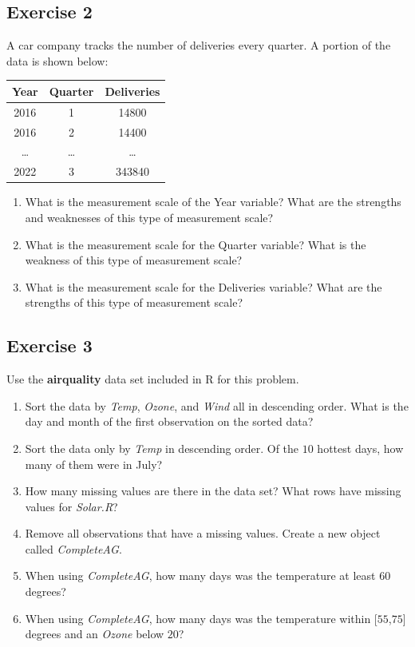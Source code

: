 \documentclass[
  letterpaper,
  DIV=11,
  numbers=noendperiod]{scrreprt}
\providecommand{\tightlist}{%
  \setlength{\itemsep}{0pt}\setlength{\parskip}{0pt}}\usepackage{longtable,booktabs,array}
\begin{document}
\hypertarget{exercise-2}{%
\subsection*{Exercise 2}\label{exercise-2}}

A car company tracks the number of deliveries every quarter. A portion
of the data is shown below:

\begin{longtable}[]{@{}ccc@{}}
\toprule()
Year & Quarter & Deliveries \\
\midrule()
\endhead
2016 & 1 & 14800 \\
2016 & 2 & 14400 \\
\ldots{} & \ldots{} & \ldots{} \\
2022 & 3 & 343840 \\
\bottomrule()
\end{longtable}

\begin{enumerate}
\def\labelenumi{\arabic{enumi}.}
\tightlist
\item
  What is the measurement scale of the Year variable? What are the
  strengths and weaknesses of this type of measurement scale?
\item
  What is the measurement scale for the Quarter variable? What is the
  weakness of this type of measurement scale?
\item
  What is the measurement scale for the Deliveries variable? What are
  the strengths of this type of measurement scale?
\end{enumerate}

\hypertarget{exercise-3}{%
\subsection*{Exercise 3}\label{exercise-3}}

Use the \textbf{airquality} data set included in R for this problem.

\begin{enumerate}
\def\labelenumi{\arabic{enumi}.}
\tightlist
\item
  Sort the data by \emph{Temp}, \emph{Ozone}, and \emph{Wind} all in
  descending order. What is the day and month of the first observation
  on the sorted data?
\item
  Sort the data only by \emph{Temp} in descending order. Of the \(10\)
  hottest days, how many of them were in July?
\item
  How many missing values are there in the data set? What rows have
  missing values for \emph{Solar.R}?
\item
  Remove all observations that have a missing values. Create a new
  object called \emph{CompleteAG}.
\item
  When using \emph{CompleteAG}, how many days was the temperature at
  least \(60\) degrees?
\item
  When using \emph{CompleteAG}, how many days was the temperature within
  {[}\(55\),\(75\){]} degrees and an \emph{Ozone} below \(20\)?
\end{enumerate}
\end{document}
